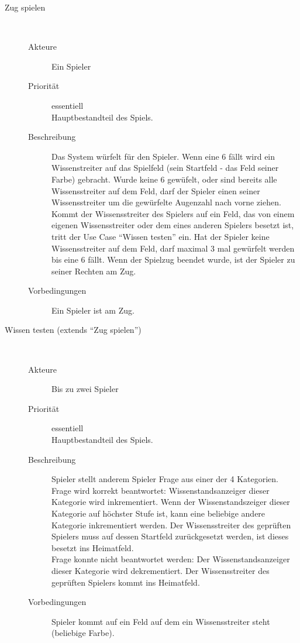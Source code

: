 \documentclass{report}
\begin{document}
\begin{description}
   \item[Zug spielen]~\par
   \begin{description}
      \item[Akteure] Ein Spieler
      \item[Priorität] essentiell\\Hauptbestandteil des Spiels.
      \item[Beschreibung] Das System würfelt für den Spieler. Wenn eine 6 fällt wird ein Wissenstreiter auf das Spielfeld (sein Startfeld - das Feld seiner Farbe) gebracht. Wurde keine 6 gewüfelt, oder sind bereits alle Wissensstreiter auf dem Feld, darf der Spieler einen seiner Wissensstreiter um die gewürfelte Augenzahl nach vorne ziehen. Kommt der Wissensstreiter des Spielers auf ein Feld, das von einem eigenen Wissensstreiter oder dem eines anderen Spielers besetzt ist, tritt der Use Case "`Wissen testen"' ein. Hat der Spieler keine Wissensstreiter auf dem Feld, darf maximal 3 mal gewürfelt werden bis eine 6 fällt. Wenn der Spielzug beendet wurde, ist der Spieler zu seiner Rechten am Zug.
      \item[Vorbedingungen] Ein Spieler ist am Zug.
   \end{description}


   \item[Wissen testen (extends "`Zug spielen"')]~\par
   \begin{description}
      \item[Akteure] Bis zu zwei Spieler
      \item[Priorität] essentiell\\Hauptbestandteil des Spiels.
      \item[Beschreibung] Spieler stellt anderem Spieler Frage aus einer der 4 Kategorien.\\
Frage wird korrekt beantwortet: Wissenstandsanzeiger dieser Kategorie wird inkrementiert. Wenn der Wissenstandszeiger dieser Kategorie auf höchster Stufe ist, kann eine beliebige andere Kategorie inkrementiert werden. Der Wissensstreiter des geprüften Spielers muss auf dessen Startfeld zurückgesetzt werden, ist dieses besetzt ins Heimatfeld.\\
Frage konnte nicht beantwortet werden: Der Wissenstandsanzeiger dieser Kategorie wird dekrementiert. Der Wissensstreiter des geprüften Spielers kommt ins Heimatfeld.
      \item[Vorbedingungen] Spieler kommt auf ein Feld auf dem ein Wissensstreiter steht (beliebige Farbe).
   \end{description}



\end{description}
\end{document}
